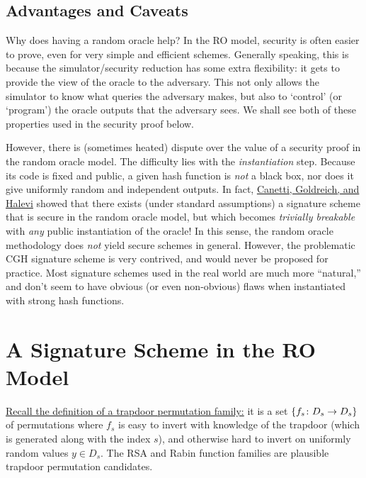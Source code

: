 \documentclass[11pt]{article}
\begin{document}
\subsection{Advantages and Caveats}
\label{sec:advantages-caveats}

Why does having a random oracle help?  In the RO model, security is
often easier to prove, even for very simple and efficient schemes.
Generally speaking, this is because the simulator/security reduction
has some extra flexibility: it gets to provide the view of the oracle
to the adversary.  This not only allows the simulator to know what
queries the adversary makes, but also to `control' (or `program') the
oracle outputs that the adversary sees.  We shall see both of these
properties used in the security proof below.

However, there is (sometimes heated) dispute over the value of a
security proof in the random oracle model.  The difficulty lies with
the \emph{instantiation} step.  Because its code is fixed and public,
a given hash function is \emph{not} a black box, nor does it give
uniformly random and independent outputs.  In fact,
\href{http://arxiv.org/abs/cs.CR/0010019}{Canetti, Goldreich, and
  Halevi} showed that there exists (under standard assumptions) a
signature scheme that is secure in the random oracle model, but which
becomes \emph{trivially breakable} with \emph{any} public
instantiation of the oracle!  In this sense, the random oracle
methodology does \emph{not} yield secure schemes in general.  However,
the problematic CGH signature scheme is very contrived, and would
never be proposed for practice.  Most signature schemes used in the
real world are much more ``natural,'' and don't seem to have obvious
(or even non-obvious) flaws when instantiated with strong hash
functions.

\section{A Signature Scheme in the RO Model}
\label{sec:signature-scheme-ro}

\href{https://github.com/cpeikert/TheoryOfCryptography/blob/master/lec10.pdf}{Recall
  the definition of a trapdoor permutation family:} it is a set
$\{f_{s} \colon D_{s} \to D_{s}\}$ of permutations where $f_{s}$ is
easy to invert with knowledge of the trapdoor (which is generated
along with the index $s$), and otherwise hard to invert on uniformly
random values $y \in D_{s}$.  The RSA and Rabin function families are
plausible trapdoor permutation candidates.
\end{document}
